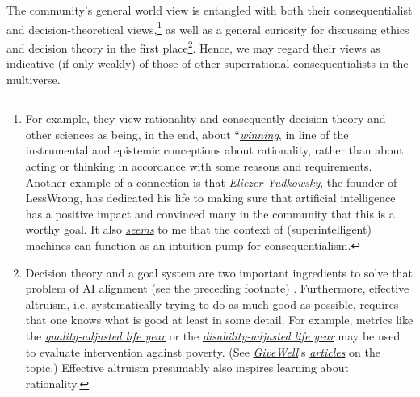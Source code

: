 The community's general world view is entangled with both their
consequentialist and decision-theoretical views,\footnote{For example,
  they view rationality and consequently decision theory and other
  sciences as being, in the end, about
  ``\href{http://lesswrong.com/lw/7i/rationality_is_systematized_winning/}{\emph{winning}},
  in line of the instrumental and epistemic conceptions about
  rationality, rather than about acting or thinking in accordance with
  some reasons and requirements. Another example of a connection is that
  \href{https://en.wikipedia.org/wiki/Eliezer_Yudkowsky}{\emph{Eliezer
  Yudkowsky}}, the founder of LessWrong, has dedicated his life to
  making sure that artificial intelligence has a positive impact and
  convinced many in the community that this is a worthy goal. It also
  \href{http://reducing-suffering.org/machine-ethics-and-preference-utilitarianism/\#Ethical_considerations}{\emph{seems}}
  to me that the context of (superintelligent) machines can function as
  an intuition pump for consequentialism.} as well as a general
curiosity for discussing ethics and decision theory in the first
place\footnote{Decision theory and a goal system are two important
  ingredients to solve that problem of AI alignment (see the preceding
  footnote) \parencite{Soares2015-is,Bostrom2014-pc}.
  Furthermore, effective altruism, i.e. systematically trying to do as
  much good as possible, requires that one knows what is good at least
  in some detail. For example, metrics like the
  \href{https://en.wikipedia.org/wiki/Quality-adjusted_life_year}{\emph{quality-adjusted
  life year}} or the
  \href{https://en.wikipedia.org/wiki/Disability-adjusted_life_year}{\emph{disability-adjusted
  life year}} may be used to evaluate intervention against poverty. (See
  \href{http://www.givewell.org/}{\emph{GiveWell}}'s
  \href{http://blog.givewell.org/2008/08/07/disability-adjusted-life-years-introduction/}{\emph{articles}}
  on the topic.) Effective altruism presumably also inspires learning
  about rationality.}. Hence, we may regard their views as indicative
(if only weakly) of those of other superrational consequentialists in
the multiverse.


